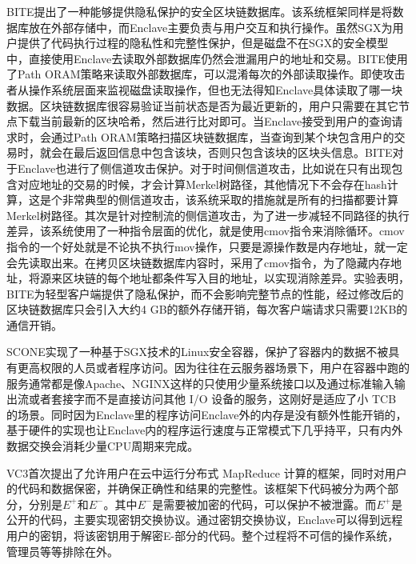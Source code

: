 \documentclass{source/Paper}
\begin{document}
        BITE\cite{matetic2019bite}提出了一种能够提供隐私保护的安全区块链数据库。该系统框架同样是将数据库放在外部存储中，而Enclave主要负责与用户交互和执行操作。虽然SGX为用户提供了代码执行过程的隐私性和完整性保护，但是磁盘不在SGX的安全模型中，直接使用Enclave去读取外部数据库仍然会泄漏用户的地址和交易。BITE使用了Path ORAM\cite{stefanov2018path}策略来读取外部数据库，可以混淆每次的外部读取操作。即使攻击者从操作系统层面来监视磁盘读取操作，但也无法得知Enclave具体读取了哪一块数据。区块链数据库很容易验证当前状态是否为最近更新的，用户只需要在其它节点下载当前最新的区块哈希，然后进行比对即可。当Enclave接受到用户的查询请求时，会通过Path ORAM策略扫描区块链数据库，当查询到某个块包含用户的交易时，就会在最后返回信息中包含该块，否则只包含该块的区块头信息。BITE对于Enclave也进行了侧信道攻击保护。对于时间侧信道攻击，比如说在只有出现包含对应地址的交易的时候，才会计算Merkel树路径，其他情况下不会存在hash计算，这是个非常典型的侧信道攻击，该系统采取的措施就是所有的扫描都要计算Merkel树路径。其次是针对控制流的侧信道攻击，为了进一步减轻不同路径的执行差异，该系统使用了一种指令层面的优化，就是使用cmov指令来消除循环。cmov指令的一个好处就是不论执不执行mov操作，只要是源操作数是内存地址，就一定会先读取出来。在拷贝区块链数据库内容时，采用了cmov指令，为了隐藏内存地址，将源来区块链的每个地址都条件写入目的地址，以实现消除差异。实验表明，BITE为轻型客户端提供了隐私保护，而不会影响完整节点的性能，经过修改后的区块链数据库只会引入大约4 GB的额外存储开销，每次客户端请求只需要12KB的通信开销。
        
        SCONE\cite{arnautov2016scone}实现了一种基于SGX技术的Linux安全容器，保护了容器内的数据不被具有更高权限的人员或者程序访问。因为往往在云服务器场景下，用户在容器中跑的服务通常都是像Apache、NGINX这样的只使用少量系统接口以及通过标准输入输出流或者套接字而不是直接访问其他 I/O 设备的服务，这刚好是适应了小 TCB 的场景。同时因为Enclave里的程序访问Enclave外的内存是没有额外性能开销的，基于硬件的实现也让Enclave内的程序运行速度与正常模式下几乎持平，只有内外数据交换会消耗少量CPU周期来完成。

        VC3\cite{schuster2015vc3}首次提出了允许用户在云中运行分布式 MapReduce 计算的框架，同时对用户的代码和数据保密，并确保正确性和结果的完整性。该框架下代码被分为两个部分，分别是$E^{+}$和$E^{-}$。其中$E^{-}$是需要被加密的代码，可以保护不被泄露。而$E^{+}$是公开的代码，主要实现密钥交换协议。通过密钥交换协议，Enclave可以得到远程用户的密钥，将该密钥用于解密E-部分的代码。整个过程将不可信的操作系统，管理员等等排除在外。
\end{document}
